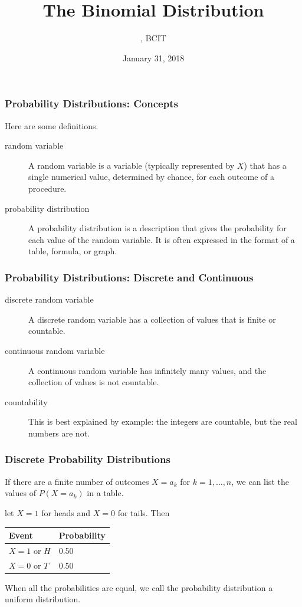 \documentclass[xcolor=dvipsnames]{beamer}
\title{The Binomial Distribution}
\subtitle{{\CourseNumber}, BCIT}
\author{\CourseName}
\date{January 31, 2018}
\begin{document}
\begin{frame}
  \titlepage
\end{frame}

\begin{frame}
  \frametitle{Probability Distributions: Concepts}
Here are some definitions.
\begin{description}
\item[random variable] A random variable is a variable (typically
  represented by $X$) that has a single numerical value, determined by
  chance, for each outcome of a procedure.
\item[probability distribution] A probability distribution is a
  description that gives the probability for each value of the random
  variable. It is often expressed in the format of a table, formula,
  or graph.
\end{description}
\end{frame}

\begin{frame}
  \frametitle{Probability Distributions: Discrete and Continuous}
\begin{description}
\item[discrete random variable] A \alert{discrete} random variable has
  a collection of values that is finite or countable.
\item[continuous random variable] A \alert{continuous} random variable has
  infinitely many values, and the collection of values is not
  countable.
\item[countability] This is best explained by example: the integers
  are countable, but the real numbers are not.
\end{description}
\end{frame}

\begin{frame}
  \frametitle{Discrete Probability Distributions}
  If there are a finite number of outcomes $X=a_{k}$ for
  $k=1,\ldots,n$, we can list the values of $P(X=a_{k})$ in a table. 

\bigskip

\label{ex:ootiteij} let $X=1$ for heads and $X=0$
for tails. Then 

\bigskip

\begin{tabular}{|l|l|}\hline
  Event & Probability \\ \hline
  $X=1$ or $H$ & 0.50 \\ \hline
  $X=0$ or $T$ & 0.50 \\ \hline
\end{tabular}

\bigskip

When all the probabilities are equal, we call the probability
distribution a \alert{uniform distribution}.
\end{frame}
\end{document}
